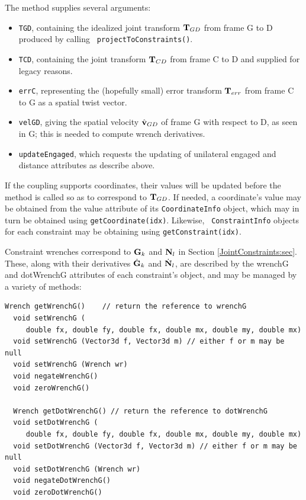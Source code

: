 The method supplies several arguments: 

\begin{itemize}

\item {\tt TGD}, containing the idealized joint transform
${\bf T}_{GD}$ from frame G to D produced by calling {\tt
projectToConstraints()}.

\item {\tt TCD}, containing the joint transform ${\bf T}_{CD}$ from
frame C to D and supplied for legacy reasons.

\item {\tt errC}, representing the (hopefully small) error transform
${\bf T}_{err}$ from frame C to G as a spatial twist vector.

\item {\tt velGD}, giving the spatial velocity $\hat{{\bf v}}_{GD}$ of frame
G with respect to D, as seen in G; this is needed to compute wrench
derivatives.

\item {\tt updateEngaged}, which requests the updating of unilateral
{\sf engaged} and {\sf distance} attributes as describe above.

\end{itemize}

If the coupling supports coordinates, their values will be updated
before the method is called so as to correspond to ${\bf T}_{GD}$. If
needed, a coordinate's value may be obtained from the {\sf value}
attribute of its {\tt CoordinateInfo} object, which may in turn be
obtained using {\tt getCoordinate(idx)}. Likewise, {\tt
ConstraintInfo} objects for each constraint may be obtaining using
{\tt getConstraint(idx)}.

Constraint wrenches correspond to ${\bf G}_k$ and ${\bf N}_l$ in Section
\ref{JointConstraints:sec}. These, along with their derivatives
$\dot{{\bf G}}_k$ and $\dot{{\bf N}}_l$, are described by the {\sf wrenchG} and {\sf
dotWrenchG} attributes of each constraint's
 object, and may
be managed by a variety of methods:
%
\begin{lstlisting}[]
  Wrench getWrenchG()    // return the reference to wrenchG
  void setWrenchG (
     double fx, double fy, double fx, double mx, double my, double mx)
  void setWrenchG (Vector3d f, Vector3d m) // either f or m may be null
  void setWrenchG (Wrench wr)
  void negateWrenchG()
  void zeroWrenchG()

  Wrench getDotWrenchG() // return the reference to dotWrenchG
  void setDotWrenchG (
     double fx, double fy, double fx, double mx, double my, double mx)
  void setDotWrenchG (Vector3d f, Vector3d m) // either f or m may be null
  void setDotWrenchG (Wrench wr)
  void negateDotWrenchG()
  void zeroDotWrenchG()
\end{lstlisting}
%

